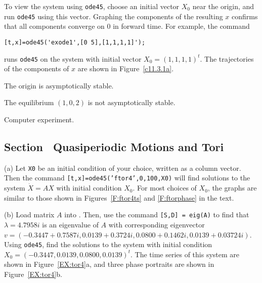 \para To view the system using {\tt ode45}, choose an initial vector $X_0$
near the origin, and run {\tt ode45} using this vector.  Graphing the
components of the resulting $x$ confirms that all components converge on $0$
in forward time.  For example, the command
\begin{verbatim}
[t,x]=ode45('exode1',[0 5],[1,1,1,1]');
\end{verbatim}
runs {\tt ode45} on the system with initial vector $X_0 = (1,1,1,1)^t$.
The trajectories of the components of $x$ are shown in Figure~\ref{c11.3.1a}.

\begin{figure}[htb]
                       \centerline{%
                       }
\end{figure}

  The origin is asymptotically stable. 

  The equilibrium $(1,0,2)$ is not asymptotically stable. 

  Computer experiment.



\subsection*{Section~\protect{\ref{S:NLD}} Quasiperiodic Motions and Tori}

(a) Let {\tt X0} be an initial condition of your choice, written as a
column vector.  Then the command {\tt [t,x]=ode45('ftor4',0,100,X0)}
will find solutions to the system $\dot{X} = AX$ with initial condition
$X_0$.  For most choices of $X_0$, the graphs are similar to those shown
in Figures~\ref{F:ftor4ts} and \ref{F:ftorphase} in the text.

(b) Load matrix $A$ into \Matlabp.  Then, use the command
{\tt [S,D] = eig(A)} to find that $\lambda = 4.7958i$ is an eigenvalue of
$A$ with corresponding eigenvector $v = (-0.3447 + 0.7587i, 0.0139 +
0.3724i, 0.0800 + 0.1462i, 0.0139 + 0.03724i)$.  Using {\tt ode45}, find
the solutions to the system with initial condition $X_0 = (-0.3447, 0.0139,
0.0800, 0.0139)^t$.  The time series of this system are shown in
Figure~\ref{EX:tor4}a, and three phase portraits are shown in
Figure~\ref{EX:tor4}b.

\begin{figure}[htb]
                       \centerline{%
			\hspace{1.0in}
                       }
\end{figure}

